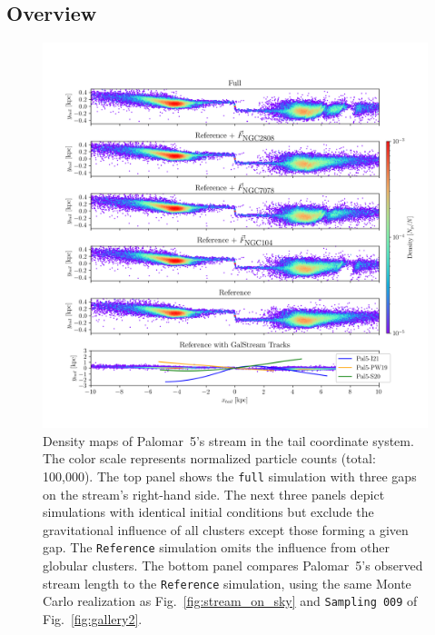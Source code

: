 \documentclass[draft]{aa}
\begin{document}
  \subsection{Overview}

    \begin{figure}
      \centering
      \includegraphics[width=\linewidth]{decomposition-monte-carlo-009-with-3-gaps-domidpoint-shift.png}
      \caption{Density maps of Palomar~5's stream in the tail coordinate system. The color scale represents normalized particle counts (total: 100,000). The top panel shows the \texttt{full} simulation with three gaps on the stream's right-hand side. The next three panels depict simulations with identical initial conditions but exclude the gravitational influence of all clusters except those forming a given gap. The \texttt{Reference} simulation omits the influence from other globular clusters. The bottom panel compares Palomar~5's observed stream length to the \texttt{Reference} simulation, using the same Monte Carlo realization as Fig.~\ref{fig:stream_on_sky} and \texttt{Sampling~009} of Fig.~\ref{fig:gallery2}.}
      \label{fig:decomposition}
    \end{figure} 
    
\end{document}
